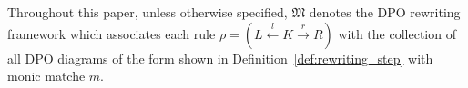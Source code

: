 

% 

%  
Throughout this paper, unless otherwise specified, 
\(\mathfrak{M}\) denotes the DPO rewriting framework which associates each rule \( \rho = (L \overset{l}{\leftarrow} K \overset{r}{\rightarrow} R) \) with the collection of all DPO diagrams of the form shown in Definition~\ref{def:rewriting_step}
with monic matche $m$.